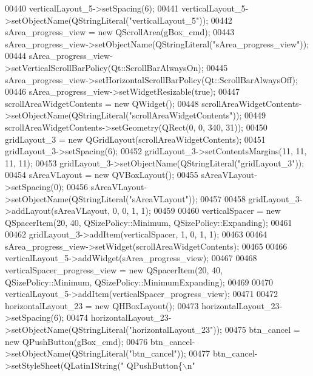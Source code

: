 \begin{DoxyCode}
00440         verticalLayout\_5->setSpacing(6);
00441         verticalLayout\_5->setObjectName(QStringLiteral(\textcolor{stringliteral}{"verticalLayout\_5"}));
00442         sArea\_progress\_view = \textcolor{keyword}{new} QScrollArea(gBox\_cmd);
00443         sArea\_progress\_view->setObjectName(QStringLiteral(\textcolor{stringliteral}{"sArea\_progress\_view"}));
00444         sArea\_progress\_view->setVerticalScrollBarPolicy(Qt::ScrollBarAlwaysOn);
00445         sArea\_progress\_view->setHorizontalScrollBarPolicy(Qt::ScrollBarAlwaysOff);
00446         sArea\_progress\_view->setWidgetResizable(\textcolor{keyword}{true});
00447         scrollAreaWidgetContents = \textcolor{keyword}{new} QWidget();
00448         scrollAreaWidgetContents->setObjectName(QStringLiteral(\textcolor{stringliteral}{"scrollAreaWidgetContents"}));
00449         scrollAreaWidgetContents->setGeometry(QRect(0, 0, 340, 31));
00450         gridLayout\_3 = \textcolor{keyword}{new} QGridLayout(scrollAreaWidgetContents);
00451         gridLayout\_3->setSpacing(6);
00452         gridLayout\_3->setContentsMargins(11, 11, 11, 11);
00453         gridLayout\_3->setObjectName(QStringLiteral(\textcolor{stringliteral}{"gridLayout\_3"}));
00454         sAreaVLayout = \textcolor{keyword}{new} QVBoxLayout();
00455         sAreaVLayout->setSpacing(0);
00456         sAreaVLayout->setObjectName(QStringLiteral(\textcolor{stringliteral}{"sAreaVLayout"}));
00457 
00458         gridLayout\_3->addLayout(sAreaVLayout, 0, 0, 1, 1);
00459 
00460         verticalSpacer = \textcolor{keyword}{new} QSpacerItem(20, 40, QSizePolicy::Minimum, QSizePolicy::Expanding);
00461 
00462         gridLayout\_3->addItem(verticalSpacer, 1, 0, 1, 1);
00463 
00464         sArea\_progress\_view->setWidget(scrollAreaWidgetContents);
00465 
00466         verticalLayout\_5->addWidget(sArea\_progress\_view);
00467 
00468         verticalSpacer\_progress\_view = \textcolor{keyword}{new} QSpacerItem(20, 40, QSizePolicy::Minimum, 
      QSizePolicy::MinimumExpanding);
00469 
00470         verticalLayout\_5->addItem(verticalSpacer\_progress\_view);
00471 
00472         horizontalLayout\_23 = \textcolor{keyword}{new} QHBoxLayout();
00473         horizontalLayout\_23->setSpacing(6);
00474         horizontalLayout\_23->setObjectName(QStringLiteral(\textcolor{stringliteral}{"horizontalLayout\_23"}));
00475         btn\_cancel = \textcolor{keyword}{new} QPushButton(gBox\_cmd);
00476         btn\_cancel->setObjectName(QStringLiteral(\textcolor{stringliteral}{"btn\_cancel"}));
00477         btn\_cancel->setStyleSheet(QLatin1String(\textcolor{stringliteral}{" QPushButton\{\(\backslash\)n"}

\end{DoxyCode}
